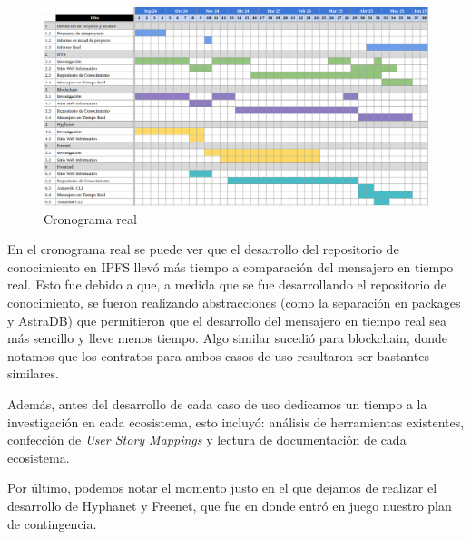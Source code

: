\begin{figure}[H]
    \centering
    \includegraphics[width=1\linewidth]{img/cronograma-real.png}
    \caption{Cronograma real}
    \label{fig:cronograma-real}
\end{figure}

En el cronograma real se puede ver que el desarrollo del repositorio de conocimiento en IPFS llevó más tiempo a comparación del mensajero en tiempo real. Esto fue debido a que, a medida que se fue desarrollando el repositorio de conocimiento, se fueron realizando abstracciones (como la separación en packages y AstraDB) que permitieron que el desarrollo del mensajero en tiempo real sea más sencillo y lleve menos tiempo. Algo similar sucedió para blockchain, donde notamos que los contratos para ambos casos de uso resultaron ser bastantes similares.

Además, antes del desarrollo de cada caso de uso dedicamos un tiempo a la investigación en cada ecosistema, esto incluyó: análisis de herramientas existentes, confección de \textit{User Story Mappings} y lectura de documentación de cada ecosistema.

Por último, podemos notar el momento justo en el que dejamos de realizar el desarrollo de Hyphanet y Freenet, que fue en donde entró en juego nuestro plan de contingencia. 